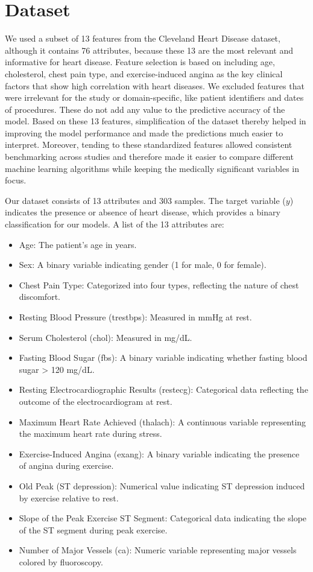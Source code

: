 \section{Dataset}
We used a subset of 13 features from the Cleveland Heart Disease dataset, although it contains 76 attributes, because these 13 are the most relevant and informative for heart disease. Feature selection is based on including age, cholesterol, chest pain type, and exercise-induced angina as the key clinical factors that show high correlation with heart diseases. We excluded features that were irrelevant for the study or domain-specific, like patient identifiers and dates of procedures. These do not add any value to the predictive accuracy of the model. Based on these 13 features, simplification of the dataset thereby helped in improving the model performance and made the predictions much easier to interpret. Moreover, tending to these standardized features allowed consistent benchmarking across studies and therefore made it easier to compare different machine learning algorithms while keeping the medically significant variables in focus.

Our dataset consists of 13 attributes and 303 samples. The target variable ($y$) indicates the presence or absence of heart disease, which provides a binary classification for our models. A list of the 13 attributes are:
\begin{itemize}
    \item Age: The patient's age in years.
    \item Sex: A binary variable indicating gender (1 for male, 0 for female).
    \item Chest Pain Type: Categorized into four types, reflecting the nature of chest discomfort.
    \item Resting Blood Pressure (trestbps): Measured in mmHg at rest.
    \item Serum Cholesterol (chol): Measured in mg/dL.
    \item Fasting Blood Sugar (fbs): A binary variable indicating whether fasting blood sugar > 120 mg/dL.
    \item Resting Electrocardiographic Results (restecg): Categorical data reflecting the outcome of the electrocardiogram at rest.
    \item Maximum Heart Rate Achieved (thalach): A continuous variable representing the maximum heart rate during stress.
    \item Exercise-Induced Angina (exang): A binary variable indicating the presence of angina during exercise.
    \item Old Peak (ST depression): Numerical value indicating ST depression induced by exercise relative to rest.
    \item Slope of the Peak Exercise ST Segment: Categorical data indicating the slope of the ST segment during peak exercise.
    \item Number of Major Vessels (ca): Numeric variable representing major vessels colored by fluoroscopy.
\end{itemize}   

